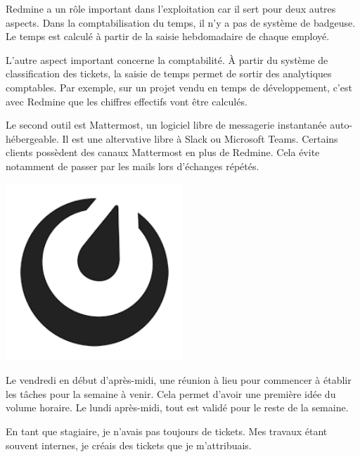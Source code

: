 \documentclass[12pt, a4paper, twoside]{article}
\begin{document}
\gls{Redmine} a un rôle important dans l'exploitation car il sert pour deux autres aspects.
Dans la comptabilisation du temps, il n'y a pas de système de badgeuse.
Le temps est calculé à partir de la saisie hebdomadaire de chaque employé.

L'autre aspect important concerne la comptabilité.
À partir du système de classification des tickets, la saisie de temps permet de sortir des analytiques comptables.
Par exemple, sur un projet vendu en temps de développement, c'est avec \gls{Redmine} que les chiffres effectifs vont être calculés. \\

\noindent%
\begin{minipage}{.7\textwidth}%
Le second outil est Mattermost, un logiciel libre de messagerie instantanée auto-hébergeable.
Il est une altervative libre à \gls{Slack} ou \gls{Microsoft Teams}.
Certains clients possèdent des canaux Mattermost en plus de \gls{Redmine}.
Cela évite notamment de passer par les mails lors d'échanges répétés. \\
\end{minipage}%
\hfill
\begin{minipage}{.3\textwidth}%
\begin{center}
\includegraphics[width=0.5\textwidth]{src/logo_mattermost.png}
\end{center}
\end{minipage}%

Le vendredi en début d'après-midi, une réunion à lieu pour commencer à établir les tâches pour la semaine à venir.
Cela permet d'avoir une première idée du volume horaire.
Le lundi après-midi, tout est validé pour le reste de la semaine.

En tant que stagiaire, je n'avais pas toujours de tickets.
Mes travaux étant souvent internes, je créais des tickets que je m'attribuais.
\end{document}
